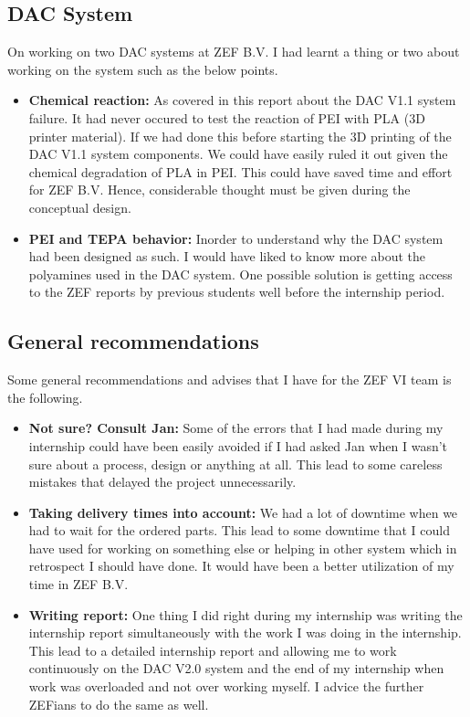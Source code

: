 \subsection{DAC System}

On working on two DAC systems at ZEF B.V. I had learnt a thing or two about working on the system such as the below points. 

\begin{itemize}
    \item \textbf{Chemical reaction: }As covered in this report about the DAC V1.1 system failure. It had never occured to test the reaction of PEI with PLA (3D printer material). If we had done this before starting the 3D printing of the DAC V1.1 system components. We could have easily ruled it out given the chemical degradation of PLA in PEI. This could have saved time and effort for ZEF B.V. Hence, considerable thought must be given during the conceptual design. 
    
    \item \textbf{PEI and TEPA behavior: }Inorder to understand why the DAC system had been designed as such. I would have liked to know more about the polyamines used in the DAC system. One possible solution is getting access to the ZEF reports by previous students well before the internship period.
\end{itemize}

\subsection{General recommendations}

Some general recommendations and advises that I have for the ZEF VI team is the following. 

\begin{itemize}
    \item \textbf{Not sure? Consult Jan: }Some of the errors that I had made during my internship could have been easily avoided if I had asked Jan when I wasn't sure about a process, design or anything at all. This lead to some careless mistakes that delayed the project unnecessarily. 
    
    \item \textbf{Taking delivery times into account: }We had a lot of downtime when we had to wait for the ordered parts. This lead to some downtime that I could have used for working on something else or helping in other system which in retrospect I should have done. It would have been a better utilization of my time in ZEF B.V. 
    
    \item \textbf{Writing report: }One thing I did right during my internship was writing the internship report simultaneously with the work I was doing in the internship. This lead to a detailed internship report and allowing me to work continuously on the DAC V2.0 system and the end of my internship when work was overloaded and not over working myself. I advice the further ZEFians to do the same as well.   
\end{itemize}